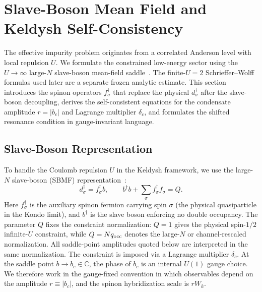 \documentclass[%
  aps,prb,reprint,amsmath,amssymb,superscriptaddress,longbibliography,floatfix
]{revtex4-2}
\begin{document}
\section{Slave-Boson Mean Field and Keldysh Self-Consistency}
\label{sec:mf}

The effective impurity problem originates from a correlated Anderson
level with local repulsion $U$.  We formulate the constrained low-energy
sector using the $U\to\infty$ large-$N$ slave-boson mean-field
saddle~\cite{coleman1984mixed,read1983solution,SBkeld}.  The finite-$U=2$
Schrieffer--Wolff formulas used later are a separate frozen analytic estimate.
This section introduces the spinon operators
$f_\sigma^\dagger$ that replace the physical $d_\sigma^\dagger$
after the slave-boson decoupling, derives the self-consistent
equations for the condensate amplitude $r=|b_c|$ and Lagrange
multiplier $\delta_c$, and formulates the shifted resonance
condition in gauge-invariant language.

\subsection{Slave-Boson Representation}

To handle the Coulomb repulsion $U$ in the Keldysh framework,
we use the large-$N$ slave-boson (SBMF)
representation~\cite{coleman1984mixed,read1983solution,SBkeld}:
\begin{equation}
d^\dagger_\sigma = f^\dagger_\sigma b,
\qquad
b^\dagger b + \sum_\sigma f^\dagger_\sigma f_\sigma = Q.
\label{eq:sb_rep}
\end{equation}
Here $f^\dagger_\sigma$ is the auxiliary spinon fermion carrying
spin $\sigma$ (the physical quasiparticle in the Kondo limit),
and $b^\dagger$ is the slave boson enforcing no double occupancy.
The parameter $Q$ fixes the constraint normalization: $Q=1$ gives the
physical spin-$1/2$ infinite-$U$ constraint, while $Q=Nq_{\rm occ}$ denotes the
large-$N$ or channel-rescaled normalization.  All saddle-point
amplitudes quoted below are interpreted in the same normalization.
The constraint is imposed via a Lagrange multiplier $\delta_c$.
At the saddle point $b\to b_c\in\mathbb{C}$, the phase of
$b_c$ is an internal $U(1)$ gauge choice.  We therefore work in the
gauge-fixed convention in which observables depend on the amplitude
$r\equiv|b_c|$, and the spinon hybridization scale is $rW_k$.
\end{document}
